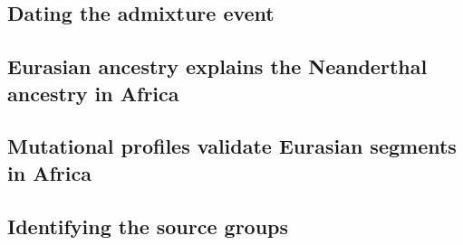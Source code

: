 



\subsection{Dating the admixture event}


\subsection{Eurasian ancestry explains the Neanderthal ancestry in Africa}



\subsection{Mutational profiles validate Eurasian segments in Africa}


\subsection{Identifying the source groups}

